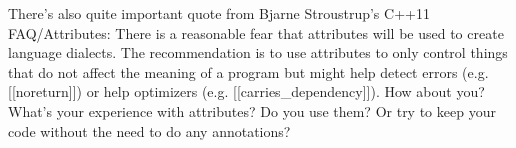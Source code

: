 There’s also quite important quote from Bjarne Stroustrup’s C++11 FAQ/Attributes:
There is a reasonable fear that attributes will be used to create language dialects. The recommendation is to use attributes to only control things that do not affect the meaning of a program but might help detect errors (e.g. [[noreturn]]) or help optimizers (e.g. [[carries_dependency]]). 
How about you?
What’s your experience with attributes? Do you use them? Or try to keep your code without the need to do any annotations?